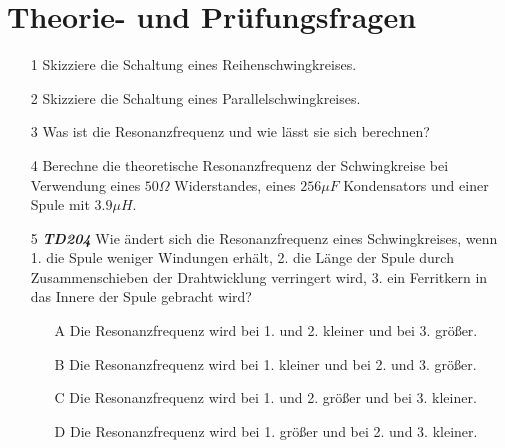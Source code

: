 \section*{Theorie- und Prüfungsfragen}


\begin{enumerate}
\itemsep1pt\parskip0pt
\item[1] Skizziere die Schaltung eines Reihenschwingkreises.
\item[2] Skizziere die Schaltung eines Parallelschwingkreises.
\item[3] Was ist die Resonanzfrequenz und wie lässt sie sich berechnen?
\item[4] Berechne die theoretische Resonanzfrequenz der Schwingkreise bei Verwendung eines $50\Omega$ Widerstandes, eines $256\mu F$ Kondensators und einer Spule mit $3.9\mu H$.
\end{enumerate}



\begin{enumerate}
\item[5] \emph{\textbf{TD204}}    Wie ändert sich die Resonanzfrequenz eines Schwingkreises, wenn 1. die Spule weniger Windungen erhält, 2. die Länge der Spule durch Zusammenschieben der Drahtwicklung verringert wird, 3. ein Ferritkern in das Innere der Spule gebracht wird? 
	\begin{enumerate}
	\itemsep1pt\parskip0pt
		\item[A] Die Resonanzfrequenz wird bei 1. und 2. kleiner und bei 3. größer. 
		\item[B] Die Resonanzfrequenz wird bei 1. kleiner und bei 2. und 3. größer.
		\item[C] Die Resonanzfrequenz wird bei 1. und 2. größer und bei 3. kleiner.
		\item[D] Die Resonanzfrequenz wird bei 1. größer und bei 2. und 3. kleiner. 
	\end{enumerate}
\end{enumerate}



